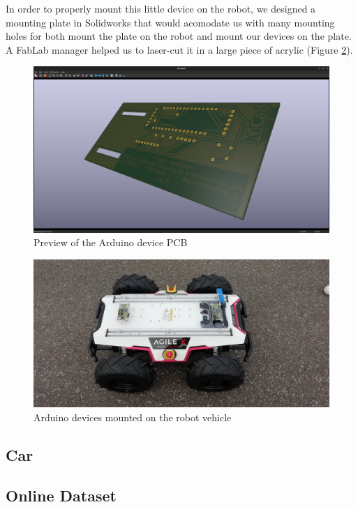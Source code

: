 In order to properly mount this little device on the robot, we designed a mounting plate in Solidworks that would acomodate us with many mounting holes for both mount the plate on the robot and mount our devices on the plate. A FabLab manager helped us to laser-cut it in a large piece of acrylic (Figure \ref{robot_1}).\\

\begin{figure}
    \center
    \includegraphics[scale=.12]{img/pcb_preview.png}
    \caption{Preview of the Arduino device PCB}
    \label{pcb_preview}
\end{figure}

\begin{figure}
    \center
    \includegraphics[scale=.15]{img/robot_1.png}
    \caption{Arduino devices mounted on the robot vehicle}
    \label{robot_1}
\end{figure}

\subsection{Car}

\subsection{Online Dataset}

